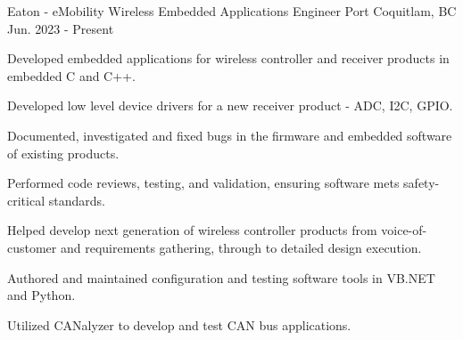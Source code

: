 


\begin{cventries}
    \cventry
    {Eaton - eMobility Wireless} %
    {Embedded Applications Engineer} %
    {Port Coquitlam, BC} %
    {Jun. 2023 - Present} %
    { %
        \begin{cvitems}
            \item {Developed embedded applications for wireless controller and receiver products in embedded C and C++.}
            \item {Developed low level device drivers for a new receiver product - ADC, I2C, GPIO.}
            \item {Documented, investigated and fixed bugs in the firmware and embedded software of existing products.}
            \item {Performed code reviews, testing, and validation, ensuring software mets safety-critical standards.}
            \item {Helped develop next generation of wireless controller products from voice-of-customer and requirements gathering, through to detailed design execution.}
            \item {Authored and maintained configuration and testing software tools in VB.NET and Python.}
            \item {Utilized CANalyzer to develop and test CAN bus applications. }
        \end{cvitems}
        \vspace{3mm}
        \vspace{1mm}
    }


\end{cventries}
